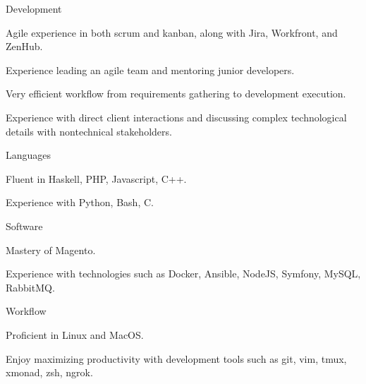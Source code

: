 \begin{cvskills}
  \cvskill
    {Development}
    {
      \begin{cvitems}
        \item Agile experience in both scrum and kanban, along with Jira, Workfront, and ZenHub.
        \item Experience leading an agile team and mentoring junior developers.
        \item Very efficient workflow from requirements gathering to development execution.
        \item Experience with direct client interactions and discussing complex technological details with nontechnical stakeholders.
      \end{cvitems}
    }
  \cvskill
    {Languages}
    {
      \begin{cvitems}
        \item Fluent in Haskell, PHP, Javascript, C++.
        \item Experience with Python, Bash, C.
      \end{cvitems}
    }
  \cvskill
    {Software}
    {
      \begin{cvitems}
        \item Mastery of Magento.
        \item Experience with technologies such as Docker, Ansible, NodeJS, Symfony, MySQL, RabbitMQ.
      \end{cvitems}
    }
  \cvskill
    {Workflow}
    {
      \begin{cvitems}
        \item Proficient in Linux and MacOS.
        \item Enjoy maximizing productivity with development tools such as git, vim, tmux, xmonad, zsh, ngrok.
      \end{cvitems}
    }
\end{cvskills}
